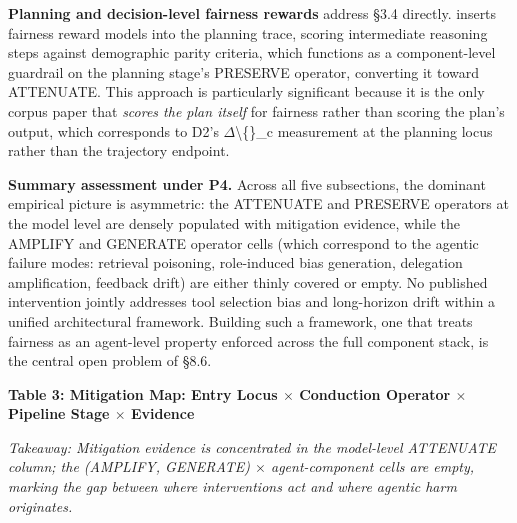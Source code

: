 \documentclass[10pt]{article}
\begin{document}
\textbf{Planning and decision-level fairness rewards} address \S{}3.4 directly. \cite{hall2025guiding} inserts fairness reward models into the planning trace, scoring intermediate reasoning steps against demographic parity criteria, which functions as a component-level guardrail on the planning stage's PRESERVE operator, converting it toward ATTENUATE. This approach is particularly significant because it is the only corpus paper that \emph{scores the plan itself} for fairness rather than scoring the plan's output, which corresponds to D2's $\Delta$\textbackslash\{\}\_c measurement at the planning locus rather than the trajectory endpoint.

\textbf{Summary assessment under P4.} Across all five subsections, the dominant empirical picture is asymmetric: the ATTENUATE and PRESERVE operators at the model level are densely populated with mitigation evidence, while the AMPLIFY and GENERATE operator cells (which correspond to the agentic failure modes: retrieval poisoning, role-induced bias generation, delegation amplification, feedback drift) are either thinly covered or empty. No published intervention jointly addresses tool selection bias and long-horizon drift within a unified architectural framework. Building such a framework, one that treats fairness as an agent-level property enforced across the full component stack, is the central open problem of \S{}8.6.


\textbf{Table 3: Mitigation Map: Entry Locus $\times$ Conduction Operator $\times$ Pipeline Stage $\times$ Evidence}

\emph{Takeaway: Mitigation evidence is concentrated in the model-level ATTENUATE column; the (AMPLIFY, GENERATE) $\times$ agent-component cells are empty, marking the gap between where interventions act and where agentic harm originates.}
\end{document}
